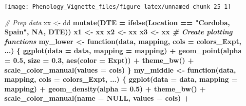 \documentclass[
]{article}
\newenvironment{Shaded}{\begin{snugshade}}{\end{snugshade}}
\newcommand{\CommentTok}[1]{\textcolor[rgb]{0.56,0.35,0.01}{\textit{#1}}}
\newcommand{\ControlFlowTok}[1]{\textcolor[rgb]{0.13,0.29,0.53}{\textbf{#1}}}
\newcommand{\DataTypeTok}[1]{\textcolor[rgb]{0.13,0.29,0.53}{#1}}
\newcommand{\FloatTok}[1]{\textcolor[rgb]{0.00,0.00,0.81}{#1}}
\newcommand{\KeywordTok}[1]{\textcolor[rgb]{0.13,0.29,0.53}{\textbf{#1}}}
\newcommand{\NormalTok}[1]{#1}
\newcommand{\OperatorTok}[1]{\textcolor[rgb]{0.81,0.36,0.00}{\textbf{#1}}}
\newcommand{\OtherTok}[1]{\textcolor[rgb]{0.56,0.35,0.01}{#1}}
\newcommand{\StringTok}[1]{\textcolor[rgb]{0.31,0.60,0.02}{#1}}
\begin{document}
\texttt{[image: Phenology\_Vignette\_files/figure-latex/unnamed-chunk-25-1]}

\begin{Shaded}
\begin{Highlighting}[]
\CommentTok{# Prep data}
\NormalTok{xx <-}\StringTok{ }\NormalTok{dd }\OperatorTok{%
\StringTok{  }\KeywordTok{mutate}\NormalTok{(}\DataTypeTok{DTE =} \KeywordTok{ifelse}\NormalTok{(Location }\OperatorTok{==}\StringTok{ "Cordoba, Spain"}\NormalTok{, }\OtherTok{NA}\NormalTok{, DTE))}
\NormalTok{x1 <-}\StringTok{ }\NormalTok{xx }\OperatorTok{%
\NormalTok{x2 <-}\StringTok{ }\NormalTok{xx }\OperatorTok{%
\NormalTok{x3 <-}\StringTok{ }\NormalTok{xx }\OperatorTok{%
\CommentTok{# Create plotting functions}
\NormalTok{my_lower <-}\StringTok{ }\ControlFlowTok{function}\NormalTok{(data, mapping, }\DataTypeTok{cols =}\NormalTok{ colors_Expt, ...) \{}
  \KeywordTok{ggplot}\NormalTok{(}\DataTypeTok{data =}\NormalTok{ data, }\DataTypeTok{mapping =}\NormalTok{ mapping) }\OperatorTok{+}
\StringTok{    }\KeywordTok{geom_point}\NormalTok{(}\DataTypeTok{alpha =} \FloatTok{0.5}\NormalTok{, }\DataTypeTok{size =} \FloatTok{0.3}\NormalTok{, }\KeywordTok{aes}\NormalTok{(}\DataTypeTok{color =}\NormalTok{ Expt)) }\OperatorTok{+}
\StringTok{    }\KeywordTok{theme_bw}\NormalTok{() }\OperatorTok{+}\StringTok{ }
\StringTok{    }\KeywordTok{scale_color_manual}\NormalTok{(}\DataTypeTok{values =}\NormalTok{ cols)}
\NormalTok{\}}
\NormalTok{my_middle <-}\StringTok{ }\ControlFlowTok{function}\NormalTok{(data, mapping, }\DataTypeTok{cols =}\NormalTok{ colors_Expt, ...) \{}
  \KeywordTok{ggplot}\NormalTok{(}\DataTypeTok{data =}\NormalTok{ data, }\DataTypeTok{mapping =}\NormalTok{ mapping) }\OperatorTok{+}\StringTok{ }
\StringTok{    }\KeywordTok{geom_density}\NormalTok{(}\DataTypeTok{alpha =} \FloatTok{0.5}\NormalTok{) }\OperatorTok{+}\StringTok{ }\KeywordTok{theme_bw}\NormalTok{() }\OperatorTok{+}
\StringTok{    }\KeywordTok{scale_color_manual}\NormalTok{(}\DataTypeTok{name =} \OtherTok{NULL}\NormalTok{, }\DataTypeTok{values =}\NormalTok{ cols) }\OperatorTok{+}
}}}}
\end{Highlighting}
\end{Shaded}
\end{document}
